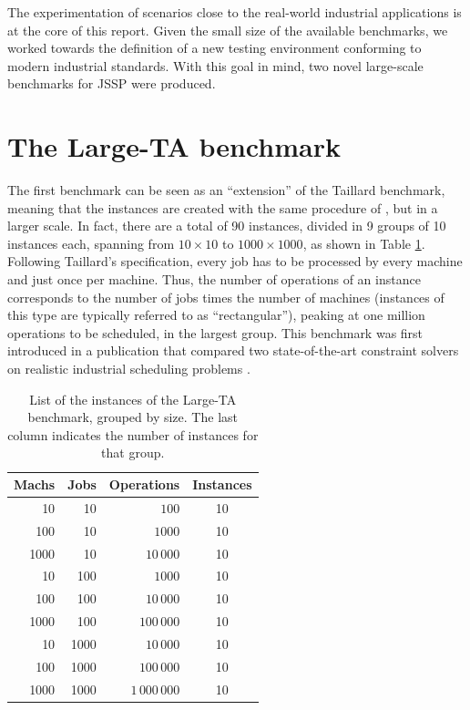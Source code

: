 \documentclass{article}
\begin{document}
The experimentation of scenarios close to the real-world industrial applications is at the core of this report. Given the small size of the available benchmarks, we worked towards the definition of a new testing environment conforming to modern industrial standards. With this goal in mind, two novel large-scale benchmarks for JSSP were produced. 

\section{The Large-TA benchmark}
The first benchmark can be seen as an ``extension'' of the Taillard benchmark, meaning that the instances are created with the same procedure of \cite{taillard}, but in a larger scale. In fact, there are a total of 90 instances, divided in 9 groups of 10 instances each, spanning from $10 \times 10$ to $1000 \times 1000$, as shown in Table \ref{table:lt}. Following Taillard's specification, every job has to be processed by every machine and just once per machine. Thus, the number of operations of an instance corresponds to the number of jobs times the number of machines (instances of this type are typically referred to as ``rectangular''), peaking at one million operations to be scheduled, in the largest group. This benchmark was first introduced in a publication that compared two state-of-the-art constraint solvers on realistic industrial scheduling problems \cite{dacol2019cp}.

\begin{table}[h]
\centering
\begin{tabular}{rrr|c}
\textbf{Machs} & \textbf{Jobs} & \textbf{Operations} & \textbf{Instances} \\ \hline
10             & 10            & $100$                 & 10                 \\
100            & 10            & $1000$                & 10                 \\
1000           & 10            & $10\,000$                 & 10                 \\ \hline
10             & 100           & $1000$                & 10                 \\
100            & 100           & $10\,000$                  & 10                 \\
1000           & 100           & $100\,000$             & 10                 \\ \hline
10             & 1000          & $10\,000$               & 10                 \\
100            & 1000          & $100\,000$                & 10                 \\
1000           & 1000          & $1\,000\,000$             & 10                
\end{tabular}
\caption{List of the instances of the Large-TA benchmark, grouped by size. The last column indicates the number of instances for that group.}
\label{table:lt}
\end{table}
\end{document}
